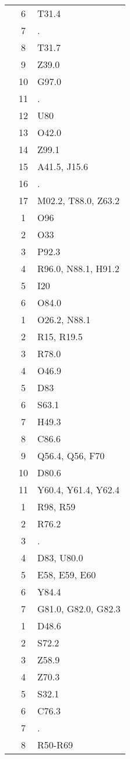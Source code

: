 \begin{table}[htbp]
\begin{tabular}{c c l}
	 & 6 & T31.4 \\
	 & 7 & . \\
	 & 8 & T31.7 \\
	 & 9 & Z39.0 \\
	 & 10 & G97.0 \\
	 & 11 & . \\
	 & 12 & U80 \\
	 & 13 & O42.0 \\
	 & 14 & Z99.1 \\
	 & 15 & A41.5, J15.6 \\
	 & 16 & . \\
	 & 17 & M02.2, T88.0, Z63.2 \\
	\addlinespace
	4 & 1 & O96 \\
	 & 2 & O33 \\
	 & 3 & P92.3 \\
	 & 4 & R96.0, N88.1, H91.2 \\
	 & 5 & I20 \\
	 & 6 & O84.0 \\
	\addlinespace
	5 & 1 & O26.2, N88.1 \\
	 & 2 & R15, R19.5 \\
	 & 3 & R78.0 \\
	 & 4 & O46.9 \\
	 & 5 & D83 \\
	 & 6 & S63.1 \\
	 & 7 & H49.3 \\
	 & 8 & C86.6 \\
	 & 9 & Q56.4, Q56, F70 \\
	 & 10 & D80.6 \\
	 & 11 & Y60.4, Y61.4, Y62.4 \\
	\addlinespace
	6 & 1 & R98, R59 \\
	 & 2 & R76.2 \\
	 & 3 & . \\
	 & 4 & D83, U80.0 \\
	 & 5 & E58, E59, E60 \\
	 & 6 & Y84.4 \\
	 & 7 & G81.0, G82.0, G82.3 \\
	\addlinespace
	7 & 1 & D48.6 \\
	 & 2 & S72.2 \\
	 & 3 & Z58.9 \\
	 & 4 & Z70.3 \\
	 & 5 & S32.1 \\
	 & 6 & C76.3 \\
	 & 7 & . \\
	 & 8 & R50-R69 \\

\end{tabular}
\end{table}
